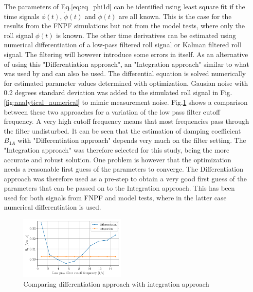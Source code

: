 The parameters of Eq.\ref{eq:eq_phi1d} can be identified using
least square fit if the time signals $\phi(t)$, $\dot{\phi}(t)$ and
$\ddot{\phi}(t)$ are all known. This is the case for the results from
the FNPF simulations but not from the model tests, where only the roll
signal $\phi(t)$ is known. The other time derivatives can be estimated
using numerical differentiation of a low-pass filtered roll signal or
Kalman filtered roll signal. The filtering will however introduce some
errors in itself. As an alternative of using this "Differentiation
approach", an "Integration approach" similar to what was used by
\citep{7505983/FJHQJJUH} and \citep{7505983/24TNAV5Z} can also be used.
The differential equation is solved numerically for estimated parameter
values determined with optimization. Gausian noise with 0.2 degrees
standard deviation was added to the simulated roll signal in
Fig.\ref{fig:analytical_numerical} to mimic measurement noise.
Fig.\ref{fig:diff_vs_int} shows a comparison between these two
approaches for a variation of the low pass filter cutoff frequency. A
very high cutoff frequency means that most frequencies pass through the
filter undisturbed. It can be seen that the estimation of damping
coefficient $B_{1A}$ with "Differentiation approach" depends very much
on the filter setting. The "Integration approach" was therefore selected
for this study, being the more accurate and robust solution. One problem
is however that the optimization needs a reasonable first guess of the
parameters to converge. The Differentiation approach was therefore used
as a pre-step to obtain a very good first guess of the parameters that
can be passed on to the Integration approach. This has been used for
both signals from FNPF and model tests, where in the latter case
numerical differentiation is used.
\begin{figure}[H]
\begin{center}\includegraphics[width = 0.475\textwidth]{figures/diff_vs_int.pdf}\end{center}
\vspace{-0.7cm}
\caption{Comparing differentiation approach with integration approach}
\label{fig:diff_vs_int}
\end{figure}
